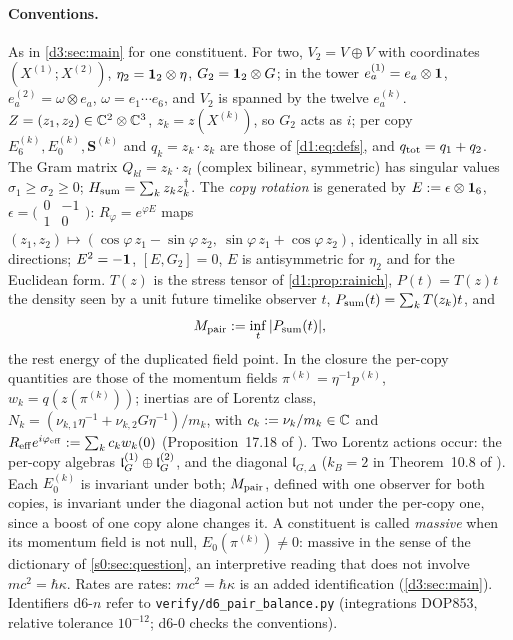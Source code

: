 \paragraph{Conventions.} As in \cref{d3:sec:main} for one constituent. For two, $V_2=V\oplus V$ with coordinates $(X^{(1)};X^{(2)})$,
$\eta_2=\mathbf 1_2\otimes\eta$, $G_2=\mathbf 1_2\otimes G$; in the tower $e^{(1)}_a=e_a\otimes\mathbf 1$, $e^{(2)}_a=\omega\otimes e_a$, $\omega=e_1\cdots e_6$,
and $V_2$ is spanned by the twelve $e^{(k)}_a$. $Z=(z_1,z_2)\in\mathbb{C}^2\otimes\mathbb{C}^3$, $z_k=z(X^{(k)})$, so $G_2$ acts as $i$; per copy
$E_6^{(k)},E_0^{(k)},\mathbf S^{(k)}$ and $q_k=z_k\cdot z_k$ are those of \eqref{d1:eq:defs}, and $q_{\rm tot}=q_1+q_2$. The Gram matrix
$Q_{kl}=z_k\cdot z_l$ (complex bilinear, symmetric) has singular values $\sigma_1\ge\sigma_2\ge0$; $H_{\rm sum}=\sum_kz_kz_k^\dagger$. The
\emph{copy rotation} is generated by $E:=\epsilon\otimes\mathbf 1_6$, $\epsilon=\bigl(\begin{smallmatrix}0&-1\\1&0\end{smallmatrix}\bigr)$:
$R_\varphi=e^{\varphi E}$ maps $(z_1,z_2)\mapsto(\cos\varphi\,z_1-\sin\varphi\,z_2,\ \sin\varphi\,z_1+\cos\varphi\,z_2)$, identically in all six
directions; $E^2=-\mathbf 1$, $[E,G_2]=0$, $E$ is antisymmetric for $\eta_2$ and for the Euclidean form. $T(z)$ is the stress tensor of
\cref{d1:prop:rainich}, $P(t)=T(z)t$ the density seen by a unit future timelike observer $t$, $P_{\rm sum}(t)=\sum_kT(z_k)t$, and
\[
M_{\rm pair}:=\inf_t|P_{\rm sum}(t)|,
\]
the rest energy of the duplicated field point. In the closure the per-copy quantities are those of the momentum fields
$\pi^{(k)}=\eta^{-1}p^{(k)}$, $w_k=q(z(\pi^{(k)}))$; inertias are of Lorentz class, $N_k=(\nu_{k,1}\eta^{-1}+\nu_{k,2}G\eta^{-1})/m_k$, with
$c_k:=\nu_k/m_k\in\mathbb{C}$ and $R_{\rm eff}e^{i\varphi_{\rm eff}}:=\sum_kc_kw_k(0)$ (Proposition~17.18 of \cite{ES17}). Two Lorentz actions occur: the
per-copy algebras $\mathfrak l_G^{(1)}\oplus\mathfrak l_G^{(2)}$, and the diagonal $\mathfrak l_{G,\Delta}$ ($k_B=2$ in Theorem~10.8 of \cite{ES17}). Each $E_0^{(k)}$ is invariant under both; $M_{\rm pair}$, defined with one observer for both copies, is invariant under the diagonal action but not under the per-copy one, since a boost of one copy alone changes it. A constituent is called \emph{massive} when its momentum field is not null, $E_0(\pi^{(k)})\neq0$:
massive in the sense of the dictionary of \cref{s0:sec:question}, an interpretive reading that does not involve $mc^2=\hbar\kappa$. Rates are rates:
$mc^2=\hbar\kappa$ is an added identification (\cref{d3:sec:main}). Identifiers d6-$n$ refer to \texttt{verify/d6\_pair\_balance.py}
(integrations DOP853, relative tolerance $10^{-12}$; d6-0 checks the conventions).

